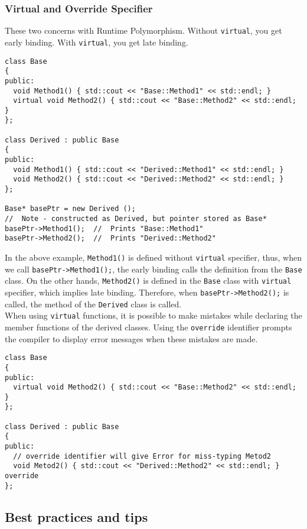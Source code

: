 \subsubsection{Virtual and Override Specifier}

These two concerns with Runtime Polymorphism. Without \verb|virtual|, you get early binding. With \verb|virtual|, you get late binding.

\begin{verbatim}
class Base
{
public:
  void Method1() { std::cout << "Base::Method1" << std::endl; }
  virtual void Method2() { std::cout << "Base::Method2" << std::endl; }
};

class Derived : public Base
{
public:
  void Method1() { std::cout << "Derived::Method1" << std::endl; }
  void Method2() { std::cout << "Derived::Method2" << std::endl; }
};

Base* basePtr = new Derived ();
//  Note - constructed as Derived, but pointer stored as Base*
basePtr->Method1();  //  Prints "Base::Method1"
basePtr->Method2();  //  Prints "Derived::Method2"
\end{verbatim}

In the above example, \texttt{Method1()} is defined without \texttt{virtual} specifier, thus, when we call \texttt{basePtr->Method1();}, the early binding calls the definition from the \texttt{Base} class. On the other hands, \texttt{Method2()} is defined in the \texttt{Base} class with \texttt{virtual} specifier, which implies late binding. Therefore, when \texttt{basePtr->Method2();} is called, the method of the \texttt{Derived} class is called.\\

When using \verb|virtual| functions, it is possible to make mistakes while declaring the member functions of the derived classes. Using the \verb|override| identifier prompts the compiler to display error messages when these mistakes are made.

\begin{verbatim}
class Base
{
public:
  virtual void Method2() { std::cout << "Base::Method2" << std::endl; }
};

class Derived : public Base
{
public:
  // override identifier will give Error for miss-typing Metod2
  void Metod2() { std::cout << "Derived::Method2" << std::endl; } override
};
\end{verbatim}

\subsection{Best practices and tips}

